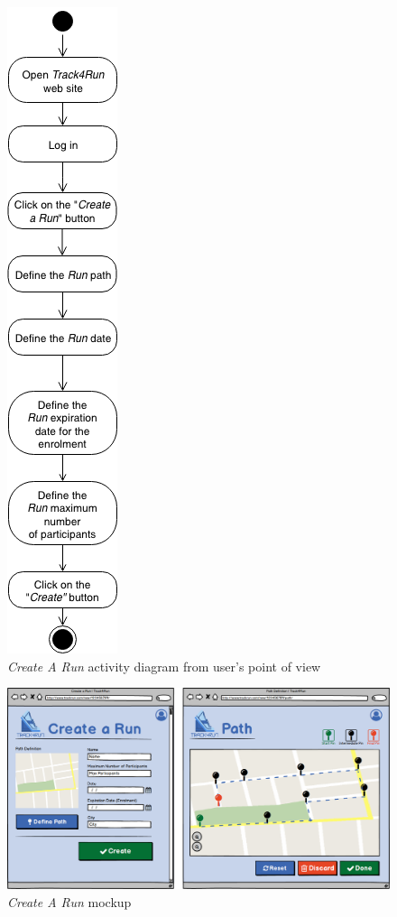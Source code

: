 \begin{figure}[H]
\begin{center}
  \includegraphics[height=0.6\paperheight]{img/activity/CreateRun.png}
  \hspace{0.05\linewidth}
  \centering
  \caption{\textit{Create A Run} activity diagram from user's point of view}
  \label{img:createRunActivityDiagram}
\end{center}
\end{figure}

\begin{figure}[H]
\begin{center}
  \includegraphics[width=\textwidth]{img/mockup/CreateRun.png}
  \hspace{0.05\linewidth}
  \centering
  \caption{\textit{Create A Run} mockup}
  \label{img:createRunMockup}
\end{center}
\end{figure}
